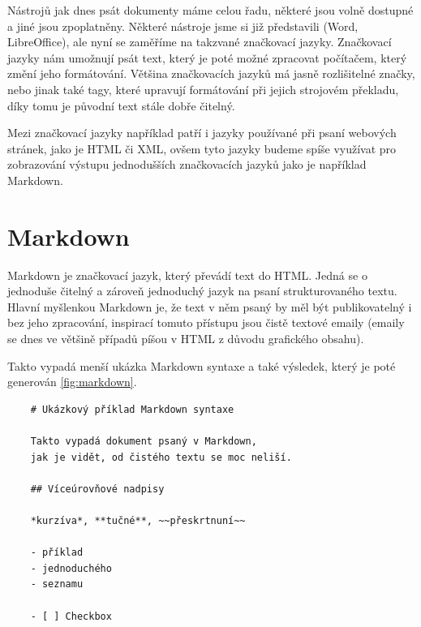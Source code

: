 Nástrojů jak dnes psát dokumenty máme celou řadu, některé jsou volně dostupné a jiné jsou zpoplatněny. Některé nástroje jsme si již představili (Word, LibreOffice), ale
nyní se zaměříme na takzvané značkovací jazyky. Značkovací jazyky nám umožnují psát text, který je poté možné zpracovat počítačem, který změní jeho formátování. Většina
značkovacích jazyků má jasně rozlišitelné značky, nebo jinak také tagy, které upravují formátování při jejich strojovém překladu, díky tomu je původní text stále dobře čitelný.
\cite{markup}

Mezi značkovací jazyky například patří i jazyky používané při psaní webových stránek, jako je HTML či XML, ovšem tyto jazyky budeme spíše využívat pro zobrazování výstupu
jednodušších značkovacích jazyků jako je například Markdown.

\section{Markdown}

Markdown je značkovací jazyk, který převádí text do HTML. Jedná se o jednoduše čitelný a zároveň jednoduchý jazyk na psaní strukturovaného textu. Hlavní myšlenkou Markdown je, že
text v něm psaný by měl být publikovatelný i bez jeho zpracování, inspirací tomuto přístupu jsou čistě textové emaily (emaily se dnes ve většině případů píšou v HTML
z důvodu grafického obsahu). \cite{markdown}


Takto vypadá menší ukázka Markdown syntaxe a také výsledek, který je poté generován \ref{fig:markdown}.

\clearpage

\begin{verbatim}
    # Ukázkový příklad Markdown syntaxe

    Takto vypadá dokument psaný v Markdown,
    jak je vidět, od čistého textu se moc neliší.

    ## Víceúrovňové nadpisy

    *kurzíva*, **tučné**, ~~přeskrtnuní~~

    - příklad
    - jednoduchého
    - seznamu

    - [ ] Checkbox
\end{verbatim}

